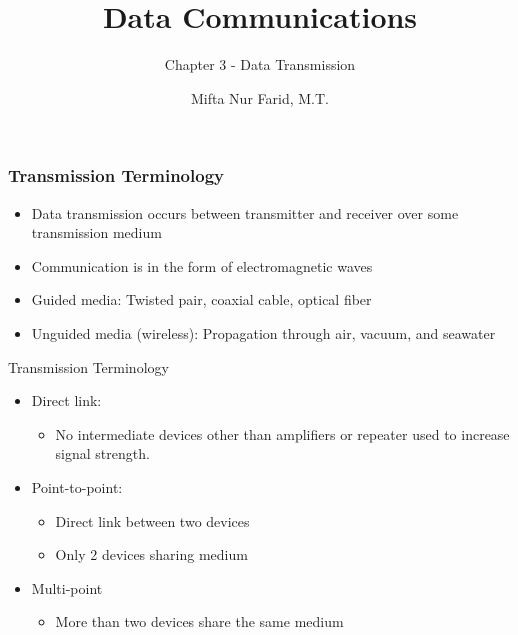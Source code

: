 \documentclass[pdflatex,compress]{beamer}
\title{Data Communications}
\subtitle{Chapter 3 - Data Transmission}
\author{Mifta Nur Farid, M.T.}
\begin{document}
\maketitle

\begin{frame}
	\frametitle{Transmission Terminology}
	\begin{itemize}
		\item Data transmission occurs between transmitter and receiver over some transmission medium
		\item Communication is in the form of electromagnetic waves
		\item Guided media: Twisted pair, coaxial cable, optical fiber
		\item Unguided media (wireless): Propagation through air, vacuum, and seawater
	\end{itemize}
\end{frame}

\begin{frame}{Transmission Terminology}
	\begin{itemize}
		\item Direct link:
		\begin{itemize}
			\item No intermediate devices other than amplifiers or repeater used to increase signal strength.
		\end{itemize}
		\item Point-to-point: 
		\begin{itemize}
			\item Direct link between two devices
			\item Only 2 devices sharing medium
		\end{itemize}
		\item Multi-point
		\begin{itemize}
			\item More than two devices share the same medium
		\end{itemize}
	\end{itemize}
\end{frame}
\end{document}

